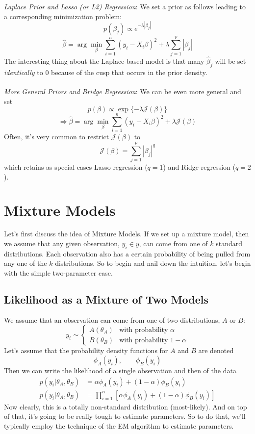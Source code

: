 \documentclass[a4paper,12pt]{scrartcl}
\begin{document}
{\sl Laplace Prior and Lasso (or L2) Regression}: We set a prior
as follows leading to a corresponding minimization problem:
\[ p(\beta_j) \propto e^{-\lambda|\beta_j|} \]
\[ \hat{\beta} = \arg \min_\beta \sum^n_{i=1} 
   (y_i - X_i \beta)^2 + \lambda  \sum^p_{j=1} |\beta_j| \]
The interesting thing about the Laplace-based model is that many
$\hat{\beta}_j$ will be set \emph{identically} to 0 because of the
cusp that occurs in the prior density.
\\
\\
{\sl More General Priors and Bridge Regression}: We can be even
more general and set
   \[ p(\beta) \propto \exp\{ -\lambda \mathcal{J}(\beta) \} \]
   \[ \Rightarrow \hat{\beta} = \arg \min_\beta \sum^n_{i=1} 
      (y_i - X_i \beta)^2 + \lambda  \mathcal{J}(\beta) \]
Often, it's very common to restrict $\mathcal{J}(\beta)$ to
\[ \mathcal{J}(\beta) = \sum^p_{j=1} |\beta_j|^q \]
which retains as special cases Lasso regression ($q=1$) and 
Ridge regression ($q=2$).




\newpage
\section{Mixture Models}

Let's first discuss the idea of Mixture Models. If we set up a mixture
model, then we assume that any given observation, $y_i \in y$, can
come from one of $k$ standard distributions. Each observation
also has a certain probability of being pulled from any one of 
the $k$ distributions. So to begin and nail down the intuition, 
let's begin with the simple two-parameter case.

\subsection{Likelihood as a Mixture of Two Models}

We assume that an observation can come from one of two distributions,
$A$ or $B$:
\[ y_i\sim\begin{cases}A(\theta_A)&\text{with probability $\alpha$} \\
      B(\theta_B) & \text{with probability $1-\alpha$} \end{cases} \]
Let's assume that the probability density functions for $A$ and $B$
are denoted
   \[ \phi_A(y_i), \qquad \phi_B(y_i) \]
Then we can write the likelihood of a single observation and then
of the data
\begin{align*}
   p(y_i | \theta_A, \theta_B) &= \alpha \phi_A(y_i) + (1-\alpha)
      \phi_B(y_i) \\
   p(y_i | \theta_A, \theta_B) &= \prod^n_{i=1}
      \left[ \alpha \phi_A(y_i) + (1-\alpha)
	 \phi_B(y_i) \right]
\end{align*}
Now clearly, this is a totally non-standard distribution (most-likely).
And on top of that, it's going to be really tough to estimate 
parameters. So to do that, we'll typically employ the technique
of the EM algorithm to estimate parameters.
\end{document}
